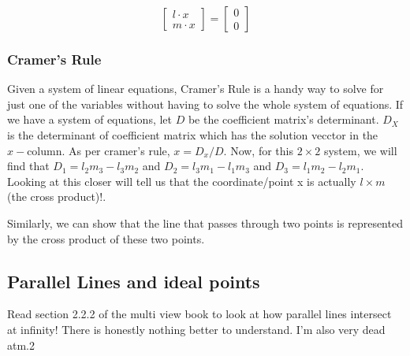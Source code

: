 \begin{equation*}
\begin{bmatrix}
l\cdot x \\
m\cdot x
\end{bmatrix} = \begin{bmatrix}
0 \\
0
\end{bmatrix}
\end{equation*}

\subsubsection{Cramer's Rule}

Given a system of linear equations, Cramer's Rule is a handy way to solve for just one of the variables without having to solve the whole system of equations. If we have a system of equations, let $D$ be the coefficient matrix's determinant. $D_X$ is the determinant of coefficient matrix which has the solution vecctor in the $x-\text{column}$. As per cramer's rule, $x = D_x / D $. Now, for this $2 \times 2$ system, we will find that $D_1 = l_2m_3 - l_3m_2$ and $D_2 = l_3m_1 - l_1m_3$ and $D_3 = l_1m_2 - l_2m_1$. Looking at this closer will tell us that the coordinate/point x is actually $l \times m$ (the cross product)!.

Similarly, we can show that the line that passes through two points is represented by the cross product of these two points. 

\subsection{Parallel Lines and ideal points}

Read section 2.2.2 of the multi view book to look at how parallel lines intersect at infinity! There is honestly nothing better to understand. I'm also very dead atm.2